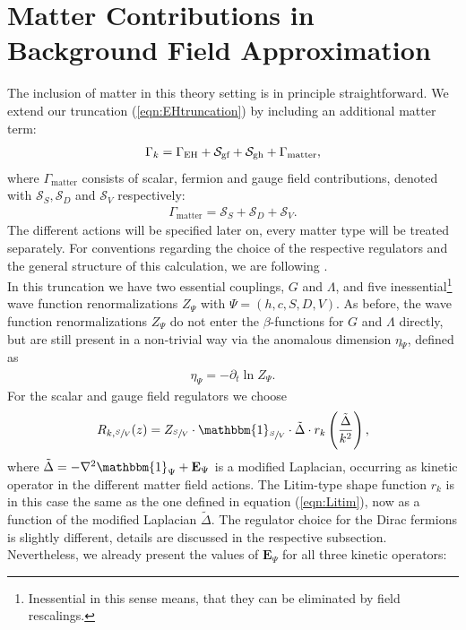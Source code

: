\section{Matter Contributions in Background Field Approximation}
The inclusion of matter in this theory setting is in principle straightforward. We extend our truncation (\ref{eqn:EHtruncation}) by including an additional matter term: 
\begin{align}
	\Gamma_{k} = \Gamma_{\text{EH}} + \mathcal{S}_{\text{gf}}+ \mathcal{S}_{\text{gh}}+ \Gamma_{\text{matter}},
\end{align}
where $\Gamma_{\mathrm{matter}}$ consists of scalar, fermion and gauge field contributions, denoted with $\mathcal{S}_S, \mathcal{S}_D$ and $\mathcal{S}_V$ respectively:
\begin{align}
	\Gamma_{\text{matter}} = \mathcal{S}_S + \mathcal{S}_D + \mathcal{S}_V.
\end{align}
The different actions will be specified later on, every matter type will be treated separately. For conventions regarding the choice of the respective regulators and the general structure of this calculation, we are following \cite{DonaEichhornPercacci2013}. \\
In this truncation we have two essential couplings, $G$ and $\Lambda$, and five inessential\footnote{Inessential in this sense means, that they can be eliminated by field rescalings.} wave function renormalizations $Z_{\Psi}$ with $\Psi = (h,c,S,D,V)$. As before, the wave function renormalizations $Z_{\Psi}$ do not enter the $\beta$-functions for $G$ and $\Lambda$ directly, but are still present in a non-trivial way via the anomalous dimension $\eta_{\Psi}$, defined as
\begin{align}
	\eta_{\Psi} = -\partial_t \ln Z_{\Psi}.
\end{align}
For the scalar and gauge field regulators we choose
\begin{align}
	R_{k,\sfrac{S}{V}}(z) = Z_{\sfrac{S}{V}} \cdot \mathbbm{1}_{\sfrac{S}{V}} \cdot \tilde{\Delta}\cdot r_k\left(\frac{\tilde{\Delta}}{k^2}\right),
	\label{eqn:Rk_matter}
\end{align}
where $\tilde{\Delta}= -\nabla^2\mathbbm{1}_{\Psi} + \mathbf{E}_{\Psi}$ is a modified Laplacian, occurring as kinetic operator in the different matter field actions. The Litim-type shape function $r_k$ is in this case the same as the one defined in equation (\ref{eqn:Litim}), now as a function of the modified Laplacian $\tilde{\Delta}$. The regulator choice for the Dirac fermions is slightly different, details are discussed in the respective subsection. Nevertheless, we already present the values of $\mathbf{E}_{\Psi}$ for all three kinetic operators:
